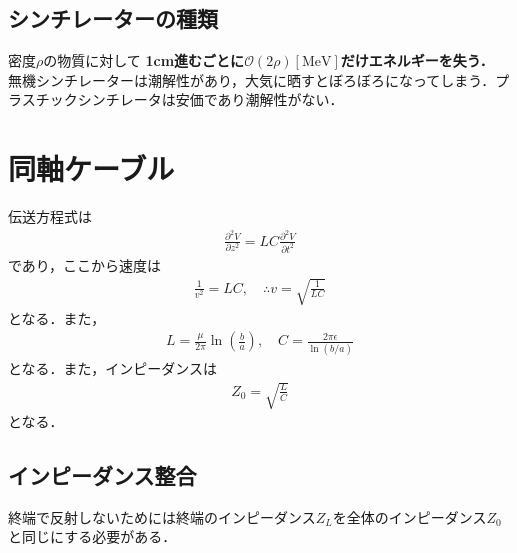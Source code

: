 \documentclass[12pt,dvipdfmx]{jsarticle}
\begin{document}
\subsection*{シンチレーターの種類}
密度$\rho$の物質に対して
\textbf{1cm進むごとに$\mathcal{O}(2\rho)[\text{MeV}]$だけエネルギーを失う．}
無機シンチレーターは潮解性があり，大気に晒すとぼろぼろになってしまう．プラスチックシンチレータは安価であり潮解性がない．
\section*{\Large{同軸ケーブル}}
伝送方程式は
\begin{eqnarray}
  \frac{\partial^2 V}{\partial z^2} = LC\frac{\partial^2 V}{\partial t^2}
\end{eqnarray}
であり，ここから速度は
\begin{eqnarray}
  \frac{1}{v^2} = LC,\quad\therefore v =\sqrt{\frac{1}{LC}}
\end{eqnarray}
となる．また，
\begin{eqnarray}
  L = \frac{\mu}{2\pi}\ln\left(\frac{b}{a}\right),\quad C = \frac{2\pi\epsilon}{\ln(b/a)}
\end{eqnarray}
となる．また，インピーダンスは
\begin{eqnarray}
  Z_0 = \sqrt{\frac{L}{C}}
\end{eqnarray}
となる．
\subsection*{インピーダンス整合}
終端で反射しないためには終端のインピーダンス$Z_L$を全体のインピーダンス$Z_0$と同じにする必要がある．
\end{document}
